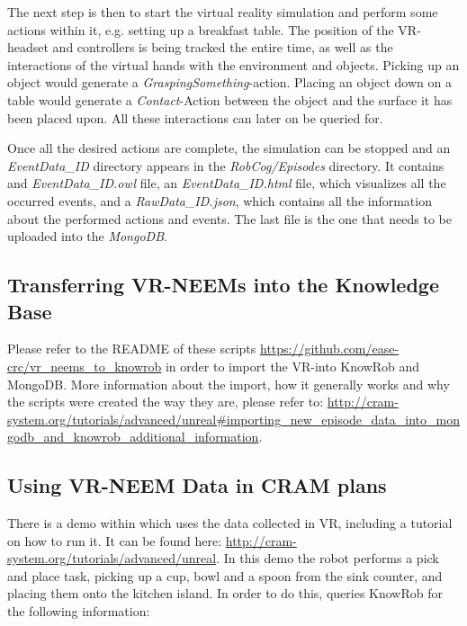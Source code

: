 The next step is then to start the virtual reality simulation and perform some actions within it, e.g. setting up a breakfast table. The position of the VR-headset and controllers is being tracked the entire time, as well as the interactions of the virtual hands with the environment and objects. Picking up an object would generate a \textit{GraspingSomething}-action. Placing an object down on a table would generate a \textit{Contact}-Action between the object and the surface it has been placed upon. All these interactions can later on be queried for. 

Once all the desired actions are complete, the simulation can be stopped and an \textit{EventData\_ID} directory appears in the \textit{RobCog/Episodes} directory. It contains and \textit{EventData\_ID.owl} file, an \textit{EventData\_ID.html} file, which visualizes all the occurred events, and a \textit{RawData\_ID.json}, which contains all the information about the performed actions and events. The last file is the one that needs to be uploaded into the \textit{MongoDB}. 


\subsection{Transferring VR-NEEMs into the Knowledge Base}
Please refer to the README of these scripts \url{https://github.com/ease-crc/vr_neems_to_knowrob} in order to import the VR-\neems into KnowRob and MongoDB. More information about the import, how it generally works and why the scripts were created the way they are, please refer to: \url{http://cram-system.org/tutorials/advanced/unreal#importing_new_episode_data_into_mongodb_and_knowrob_additional_information}. 

\subsection{Using VR-NEEM Data in CRAM plans}
There is a demo within \cram which uses the data collected in VR, including a tutorial on how to run it. It can be found here: \url{http://cram-system.org/tutorials/advanced/unreal}. In this demo the robot performs a pick and place task, picking up a cup, bowl and a spoon from the sink counter, and placing them onto the kitchen island. In order to do this, \cram queries KnowRob for the following information: 

